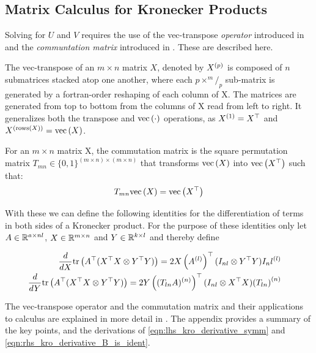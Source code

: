 \subsection*{Matrix Calculus for Kronecker Products}
Solving for $U$ and $V$ requires the use of the vec-transpose \emph{operator} introduced in \cite{Wandell1992} and the \emph {communtation matrix} introduced in \cite{Magnus1988}. These are described here.

The vec-transpose of an $m \times n$ matrix $X$, denoted by ${ X^{(p)} }$ is composed of $n$ submatrices stacked atop one another, where each $p \times ^m/_p$ sub-matrix is generated by a fortran-order reshaping of each column of X. The matrices are generated from top to bottom from the columns of X read from left to right. It generalizes both the transpose and $\text{vec}\left(\cdot\right)$ operations, as ${ X^{(1)} } = X^\top$ and ${ X^{(\text{rows}(X))} } = \text{vec}\left(X\right)$.

For an $m \times n$ matrix X, the commutation matrix is the square permutation matrix $T_{mn} \in \{0,1\}^{(m \times n) \times (m \times n)}$ that transforms $\text{vec}\left(X\right)$ into $\text{vec}\left(X^\top\right)$ such that:
\begin{equation}
T_{mn} \text{vec}\left(X\right) = \text{vec}\left(X^\top\right)
\end{equation}

With these we can define the following identities for the differentiation of terms in both sides of a Kronecker product. For the purpose of these identities only let $A \in { \mathbb{R}^{a \times nl} }$, $X \in { \mathbb{R}^{m \times n} }$ and $Y \in { \mathbb{R}^{k \times l} }$ and thereby define

\begin{align}
\begin{split}
\frac{d}{dX} \text{tr} \left( {A^\top(X^\top X \otimes Y^\top Y)} \right) & = 2X \left({ A^{(l)} }\right)^\top (I_{nl} \otimes Y^\top Y) { I_nl^{(l)} } \label{eqn:lhs_kro_derivative_symm}
\end{split} \\
\begin{split}
\frac{d}{dY} \text{tr} \left( {A^\top(X^\top X \otimes Y^\top Y)} \right) & = 2 Y \left({ (T_{ln} A)^{(n)} }\right)^\top (I_{nl} \otimes X^\top X ) { \left( T_{ln} \right)^{(n)} } \label{eqn:rhs_kro_derivative_B_is_ident}
\end{split}
\end{align}

The vec-transpose operator and the commutation matrix and their applications to calculus are explained in more detail in \cite{Minka2000a}. The appendix provides a summary of the key points, and the derivations of \eqref{eqn:lhs_kro_derivative_symm} and \eqref{eqn:rhs_kro_derivative_B_is_ident}.

